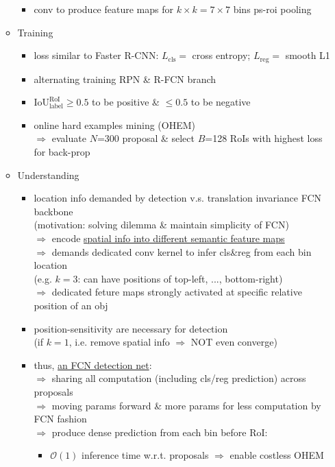 \begin{itemize}
\begin{itemize}
\begin{itemize}
		\item conv to produce feature maps for $k\times k=7\times7$ bins ps-roi pooling
		\end{itemize}
	\item Training
		\begin{itemize}
		\item loss similar to Faster R-CNN: $L_\text{cls}=$ cross entropy; $L_\text{reg}=$ smooth L1
		\item alternating training RPN \& R-FCN branch
		\item $\text{IoU}^\text{RoI}_\text{label} \ge 0.5$ to be positive \& $\le 0.5$ to be negative
		\item online hard examples mining (OHEM) \\
		$\Rightarrow$ evaluate $N$=300 proposal \& select $B$=128 RoIs with highest loss for back-prop
		\end{itemize}
	\item Understanding
		\begin{itemize}
		\item location info demanded by detection v.s. translation invariance FCN backbone \\
		(motivation: solving dilemma \& maintain simplicity of FCN) \\
		$\Rightarrow$ encode \underline{spatial info into different semantic feature maps} \\
		$\Rightarrow$ demands dedicated conv kernel to infer cls\&reg from each bin location \\
		(e.g. $k=3$: can have positions of top-left, ..., bottom-right) \\
		$\Rightarrow$ dedicated feture maps strongly activated at specific relative position of an obj
		\item position-sensitivity are necessary for detection \\
		(if $k=1$, i.e. remove spatial info $\Rightarrow$ NOT even converge)
		\item thus, \underline{an FCN detection net}: \\
		$\Rightarrow$ sharing all computation (including cls/reg prediction) across proposals \\
		$\Rightarrow$ moving params forward \& more params for less computation by FCN fashion \\
		$\Rightarrow$ produce dense prediction from each bin before RoI:
			\begin{itemize}
			\item $\mathcal O(1)$ inference time w.r.t. proposals $\Rightarrow$ enable costless OHEM

\end{itemize}
\end{itemize}
\end{itemize}
\end{itemize}
